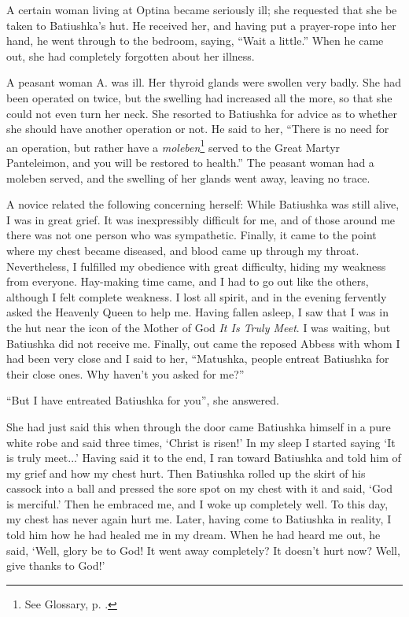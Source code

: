 A certain woman living at Optina became seriously ill; she requested that she be taken to Batiushka's hut. He received her, and having put a prayer-rope into her hand, he went through to the bedroom, saying, ``Wait a little.'' When he came out, she had completely forgotten about her illness.

A peasant woman A. was ill. Her thyroid glands were swollen very badly. She had been operated on twice, but the swelling had increased all the more, so that she could not even turn her neck. She resorted to Batiushka for advice as to whether she should have another operation or not. He said to her, ``There is no need for an operation, but rather have a \textit{moleben}\footnote{See Glossary, p. \pageref{moleben}.} served to the Great Martyr Panteleimon, and you will be restored to health.'' The peasant woman had a moleben served, and the swelling of her glands went away, leaving no trace.

\begin{longquote}{A novice related the following concerning herself:}
While Batiushka was still alive, I was in great grief. It was inexpressibly difficult for me, and of those around me there was not one person who was sympathetic. Finally, it came to the point where my chest became diseased, and blood came up through my throat. Nevertheless, I fulfilled my obedience with great difficulty, hiding my weakness from everyone. Hay-making time came, and I had to go out like the others, although I felt complete weakness. I lost all spirit, and in the evening fervently asked the Heavenly Queen to help me. Having fallen asleep, I saw that I was in the hut near the icon of the Mother of God \textit{It Is Truly Meet}. I was waiting, but Batiushka did not receive me. Finally, out came the reposed Abbess with whom I had been very close and I said to her, ``Matushka, people entreat Batiushka for their close ones. Why haven't you asked for me?''

``But I have entreated Batiushka for you'', she answered.

She had just said this when through the door came Batiushka himself in a pure white robe and said three times, `Christ is risen!' In my sleep I started saying `It is truly meet...' Having said it to the end, I ran toward Batiushka and told him of my grief and how my chest hurt. Then Batiushka rolled up the skirt of his cassock into a ball and pressed the sore spot on my chest with it and said, `God is merciful.' Then he embraced me, and I woke up completely well. To this day, my chest has never again hurt me. Later, having come to Batiushka in reality, I told him how he had healed me in my dream. When he had heard me out, he said, `Well, glory be to God! It went away completely? It doesn't hurt now? Well, give thanks to God!'
\end{longquote}

